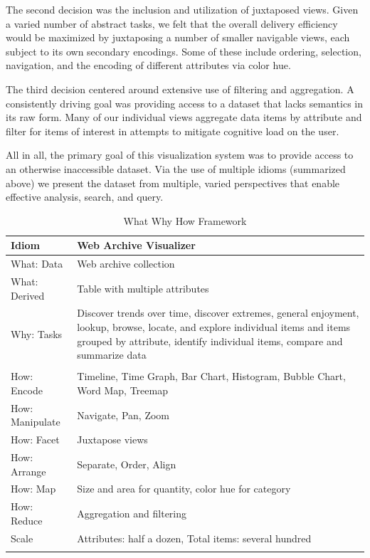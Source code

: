 \documentclass[10pt,journal,compsoc]{IEEEtran}
\begin{document}
The second decision was the inclusion and utilization of juxtaposed views.
Given a varied number of abstract tasks, we felt that the overall delivery efficiency would
be maximized by juxtaposing a number of smaller navigable views, each subject to its
own secondary encodings. Some of these include ordering, selection, navigation, and
the encoding of different attributes via color hue.

The third decision centered around extensive use of filtering and aggregation. A consistently driving goal 
was providing access to a dataset that lacks semantics in its raw form. Many of our
individual views aggregate data items by attribute and filter for items of interest 
in attempts to mitigate cognitive load on the user. 

All in all, the primary goal of this visualization system was to provide access to an otherwise inaccessible dataset.
Via the use of multiple idioms (summarized above) we present the dataset
from multiple, varied perspectives that enable effective analysis, search, and query.

\begin{table}
\renewcommand{\arraystretch}{1.3}
\caption{What Why How Framework}
\label{tab:example}
\centering
\begin{tabular}{l|l}
    \hline
    Idiom  &  Web Archive Visualizer\\
    \hline
    \hline
	What: Data & Web archive collection \\ \hline
	What: Derived & Table with multiple attributes \\   \hline
	Why: Tasks & \parbox[t]{5cm}{Discover trends over time, discover extremes, general enjoyment, lookup, browse, locate, and explore individual items and items grouped by attribute, identify individual items, compare and summarize data} \\ \\ \hline
	How: Encode & \parbox[t]{5cm}{Timeline,  Time Graph, Bar Chart, Histogram, Bubble Chart, Word Map, Treemap} \\ \hline
	How: Manipulate & Navigate, Pan, Zoom \\  \hline
	How: Facet & Juxtapose views \\  \hline
	How: Arrange & Separate, Order, Align \\ \hline
	How: Map & Size and area for quantity, color hue for category \\ \hline
	How: Reduce & Aggregation and filtering \\  \hline
Scale & \parbox[t]{5cm}{Attributes: half a dozen, Total items: several hundred} \\
	\\
    \hline
\end{tabular}
\end{table}
\end{document}
